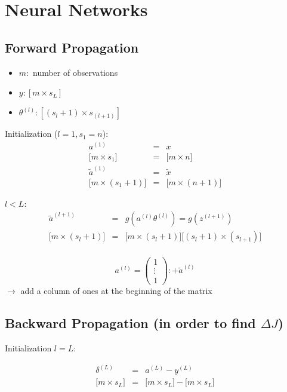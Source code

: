 \documentclass[a4paper,titlepage] {scrartcl}
\begin{document}
\section{Neural Networks}

\subsection{Forward Propagation}

\begin{itemize}
	\item $m:$ number of observations
	\item $y: [m \times s_L]$
	\item $\theta^{(l)}: [(s_l+1) \times s_{(l+1)}]$
\end{itemize}

Initialization ($l=1, s_1 = n$): 
\begin{eqnarray}
	a^{(1)} &=& x\\
	{[}m\times s_1{]} &=& {[}m \times n {]}\\
	\tilde a^{(1)} &=& \tilde x\\
	{[}m\times (s_1+1){]} &=& {[}m \times (n+1) {]}\nonumber
\end{eqnarray}

$l<L$:
\begin{eqnarray}
	\tilde a^{(l+1)} &=& g(a^{(l)}\theta^{(l)}) = g(z^{(l+1)})\\
	{[}m\times (s_l+1){]} &=& {[}m \times (s_l+1) {]}{[}(s_l+1) \times (s_{l+1}) {]}\nonumber\\
\end{eqnarray}


\begin{equation}
	a^{(l)} = \begin{pmatrix}
		1\\ \vdots \\ 1
	\end{pmatrix}
	:+ \tilde a^{(l)}
\end{equation}
$\rightarrow$ add a column of ones at the beginning of the matrix


\subsection{Backward Propagation (in order to find $\Delta J$)}

Initialization $l = L$:

\begin{eqnarray}
	\delta^{(L)} &=& a^{(L)} - y^{(L)}\\
	{[}m\times s_L{]} &=& {[}m \times s_L {]} - {[}m\times s_L{]}\nonumber
\end{eqnarray}
\end{document}
